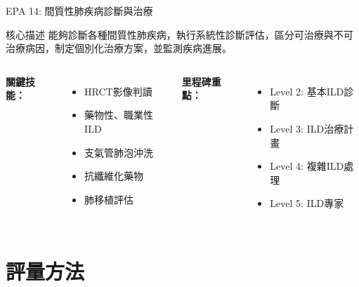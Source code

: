 \documentclass[aspectratio=169]{beamer}
\begin{document}
\begin{frame}{EPA 14: 間質性肺疾病診斷與治療}
\begin{alertblock}{核心描述}
能夠診斷各種間質性肺疾病，執行系統性診斷評估，區分可治療與不可治療病因，制定個別化治療方案，並監測疾病進展。
\end{alertblock}

\begin{columns}[c]
\textbf{關鍵技能：}
\begin{itemize}
\item HRCT影像判讀
\item 藥物性、職業性ILD
\item 支氣管肺泡沖洗
\item 抗纖維化藥物
\item 肺移植評估
\end{itemize}

\textbf{里程碑重點：}
\begin{itemize}
\item Level 2: 基本ILD診斷
\item Level 3: ILD治療計畫
\item Level 4: 複雜ILD處理
\item Level 5: ILD專家
\end{itemize}
\end{columns}
\end{frame}

\section{評量方法}
\end{document}
